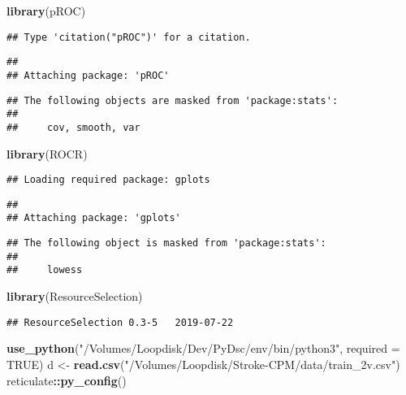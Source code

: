 \documentclass[]{article}
\newenvironment{Shaded}{\begin{snugshade}}{\end{snugshade}}
\newcommand{\DataTypeTok}[1]{\textcolor[rgb]{0.13,0.29,0.53}{#1}}
\newcommand{\KeywordTok}[1]{\textcolor[rgb]{0.13,0.29,0.53}{\textbf{#1}}}
\newcommand{\NormalTok}[1]{#1}
\newcommand{\OperatorTok}[1]{\textcolor[rgb]{0.81,0.36,0.00}{\textbf{#1}}}
\newcommand{\OtherTok}[1]{\textcolor[rgb]{0.56,0.35,0.01}{#1}}
\newcommand{\StringTok}[1]{\textcolor[rgb]{0.31,0.60,0.02}{#1}}
\begin{document}
\begin{Shaded}
\begin{Highlighting}[]
\KeywordTok{library}\NormalTok{(pROC)}
\end{Highlighting}
\end{Shaded}

\begin{verbatim}
## Type 'citation("pROC")' for a citation.
\end{verbatim}

\begin{verbatim}
## 
## Attaching package: 'pROC'
\end{verbatim}

\begin{verbatim}
## The following objects are masked from 'package:stats':
## 
##     cov, smooth, var
\end{verbatim}

\begin{Shaded}
\begin{Highlighting}[]
\KeywordTok{library}\NormalTok{(ROCR)}
\end{Highlighting}
\end{Shaded}

\begin{verbatim}
## Loading required package: gplots
\end{verbatim}

\begin{verbatim}
## 
## Attaching package: 'gplots'
\end{verbatim}

\begin{verbatim}
## The following object is masked from 'package:stats':
## 
##     lowess
\end{verbatim}

\begin{Shaded}
\begin{Highlighting}[]
\KeywordTok{library}\NormalTok{(ResourceSelection)}
\end{Highlighting}
\end{Shaded}

\begin{verbatim}
## ResourceSelection 0.3-5   2019-07-22
\end{verbatim}

\begin{Shaded}
\begin{Highlighting}[]
\KeywordTok{use_python}\NormalTok{(}\StringTok{"/Volumes/Loopdisk/Dev/PyDsc/env/bin/python3"}\NormalTok{, }\DataTypeTok{required =} \OtherTok{TRUE}\NormalTok{)}
\NormalTok{d <-}\StringTok{ }\KeywordTok{read.csv}\NormalTok{(}\StringTok{"/Volumes/Loopdisk/Stroke-CPM/data/train_2v.csv"}\NormalTok{)}
\NormalTok{reticulate}\OperatorTok{::}\KeywordTok{py_config}\NormalTok{()}
\end{Highlighting}
\end{Shaded}
\end{document}
